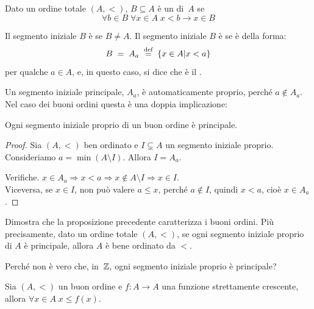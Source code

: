 \begin{definition}
	Dato un ordine totale $(A,<)$, $B \subseteq A$ \`e un
 di~$A$ se
\[\forall {b \in B} \; \forall {x \in A} \; x < b \rightarrow x \in B\]
\end{definition}

\begin{definition}
	Il segmento iniziale $B$ \`e  se $B \ne A$. Il segmento iniziale $B$ \`e  se \`e della forma:
	\[ B \;=\; A_a \;\overset{\text{def}}{=}\; \{x \in A | x < a\}
		\]
	per qualche $a \in A$, e, in questo caso, si dice  che \`e il .
\end{definition}

Un segmento iniziale principale, $A_a$, \`e automaticamente proprio,
perch\'e $a \not \in A_a$. Nel caso dei buoni ordini questa \`e una doppia
implicazione:

\begin{proposition}
	Ogni segmento iniziale proprio di un buon ordine \`e principale.
\end{proposition}

\begin{proof}
	Sia $(A,<)$ ben ordinato e $I \subsetneq A$ un segmento iniziale
proprio. Consideriamo $a = \min (A \setminus I)$. Allora $I = A_a$.

	{\drkgrn Verifiche. $x\in A_a \Rightarrow x < a \Rightarrow
x\not\in A\setminus I \Rightarrow x\in I$.\\
Viceversa, se $x\in I$, non pu\`o valere $a\le x$, perch\'e $a\not\in I$,
quindi $x<a$, cio\`e $x\in A_a$.}
\end{proof}

\begin{exercise}
	Dimostra che la proposizione precedente caratterizza i buoni ordini. Pi\`u precisamente, dato un ordine totale $(A,<)$, se ogni segmento iniziale proprio di $A$
	\`e principale, allora $A$ \`e bene ordinato da $<$.
\end{exercise}

\begin{exercise}
Perch\'e non \`e vero che, in~$\mathbb Z$, ogni segmento iniziale proprio \`e
principale?
\end{exercise}

\begin{lemma}
	Sia $(A,<)$ un buon ordine e $f \colon A \to A$ una funzione
strettamente crescente, allora $\forall {x \in A} \; x \leq f(x)$.
\end{lemma}

